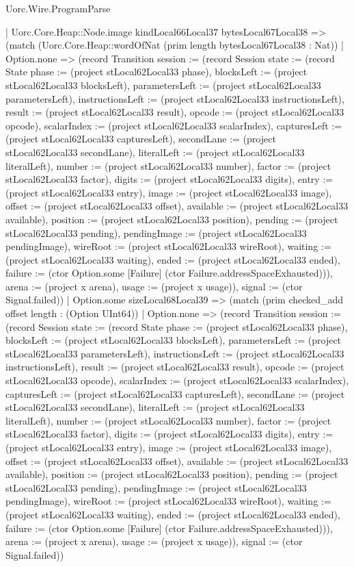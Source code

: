 \begin{lexlean}{Uorc.Wire.ProgramParse}
\begin{semanticmodule}
{        | Uorc.Core.Heap::Node.image kindLocal66Local37 bytesLocal67Local38 => (match (Uorc.Core.Heap::wordOfNat (prim length bytesLocal67Local38 : Nat))
          | Option.none => (record Transition {session := (record Session {state := (record State {phase := (project stLocal62Local33 phase), blocksLeft := (project stLocal62Local33 blocksLeft), parametersLeft := (project stLocal62Local33 parametersLeft), instructionsLeft := (project stLocal62Local33 instructionsLeft), result := (project stLocal62Local33 result), opcode := (project stLocal62Local33 opcode), scalarIndex := (project stLocal62Local33 scalarIndex), capturesLeft := (project stLocal62Local33 capturesLeft), secondLane := (project stLocal62Local33 secondLane), literalLeft := (project stLocal62Local33 literalLeft), number := (project stLocal62Local33 number), factor := (project stLocal62Local33 factor), digits := (project stLocal62Local33 digits), entry := (project stLocal62Local33 entry), image := (project stLocal62Local33 image), offset := (project stLocal62Local33 offset), available := (project stLocal62Local33 available), position := (project stLocal62Local33 position), pending := (project stLocal62Local33 pending), pendingImage := (project stLocal62Local33 pendingImage), wireRoot := (project stLocal62Local33 wireRoot), waiting := (project stLocal62Local33 waiting), ended := (project stLocal62Local33 ended), failure := (ctor Option.some [Failure] (ctor Failure.addressSpaceExhausted))}), arena := (project x arena), usage := (project x usage)}), signal := (ctor Signal.failed)})
          | Option.some sizeLocal68Local39 => (match (prim checked_add offset length : (Option UInt64))
            | Option.none => (record Transition {session := (record Session {state := (record State {phase := (project stLocal62Local33 phase), blocksLeft := (project stLocal62Local33 blocksLeft), parametersLeft := (project stLocal62Local33 parametersLeft), instructionsLeft := (project stLocal62Local33 instructionsLeft), result := (project stLocal62Local33 result), opcode := (project stLocal62Local33 opcode), scalarIndex := (project stLocal62Local33 scalarIndex), capturesLeft := (project stLocal62Local33 capturesLeft), secondLane := (project stLocal62Local33 secondLane), literalLeft := (project stLocal62Local33 literalLeft), number := (project stLocal62Local33 number), factor := (project stLocal62Local33 factor), digits := (project stLocal62Local33 digits), entry := (project stLocal62Local33 entry), image := (project stLocal62Local33 image), offset := (project stLocal62Local33 offset), available := (project stLocal62Local33 available), position := (project stLocal62Local33 position), pending := (project stLocal62Local33 pending), pendingImage := (project stLocal62Local33 pendingImage), wireRoot := (project stLocal62Local33 wireRoot), waiting := (project stLocal62Local33 waiting), ended := (project stLocal62Local33 ended), failure := (ctor Option.some [Failure] (ctor Failure.addressSpaceExhausted))}), arena := (project x arena), usage := (project x usage)}), signal := (ctor Signal.failed)})
}
\end{semanticmodule}
\end{lexlean}
